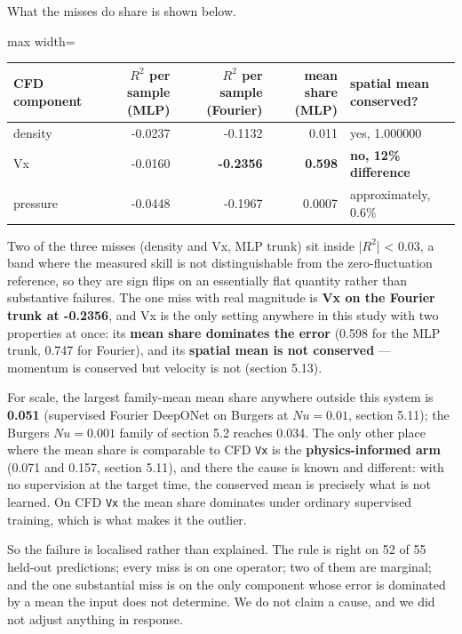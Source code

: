 \documentclass[preprint,12pt]{elsarticle}
\begin{document}
What the misses do share is shown below.

\begin{center}
\begin{adjustbox}{max width=\linewidth}
\small
\begin{tabular}{lrrrl}
\toprule
CFD component & $R^2$ per sample (MLP) & $R^2$ per sample (Fourier) & mean share (MLP) & spatial mean conserved? \\
\midrule
density & -0.0237 & -0.1132 & 0.011 & yes, 1.000000 \\
Vx & -0.0160 & \textbf{-0.2356} & \textbf{0.598} & \textbf{no, 12\% difference} \\
pressure & -0.0448 & -0.1967 & 0.0007 & approximately, 0.6\% \\
\bottomrule
\end{tabular}
\end{adjustbox}
\end{center}


Two of the three misses (density and Vx, MLP trunk) sit inside |$R^2$| < 0.03, a band where the measured skill is not distinguishable from the zero-fluctuation reference, so they are sign flips on an essentially flat quantity rather than substantive failures. The one miss with real magnitude is \textbf{Vx on the Fourier trunk at -0.2356}, and Vx is the only setting anywhere in this study with two properties at once: its \textbf{mean share dominates the error} (0.598 for the MLP trunk, 0.747 for Fourier), and its \textbf{spatial mean is not conserved} --- momentum is conserved but velocity is not (section 5.13).

For scale, the largest family-mean mean share anywhere outside this system is \textbf{0.051} (supervised Fourier DeepONet on Burgers at $Nu = 0.01$, section 5.11); the Burgers $Nu = 0.001$ family of section 5.2 reaches 0.034. The only other place where the mean share is comparable to CFD \texttt{Vx} is the \textbf{physics-informed arm} (0.071 and 0.157, section 5.11), and there the cause is known and different: with no supervision at the target time, the conserved mean is precisely what is not learned. On CFD \texttt{Vx} the mean share dominates under ordinary supervised training, which is what makes it the outlier.

So the failure is localised rather than explained. The rule is right on 52 of 55 held-out predictions; every miss is on one operator; two of them are marginal; and the one substantial miss is on the only component whose error is dominated by a mean the input does not determine. We do not claim a cause, and we did not adjust anything in response.
\end{document}
